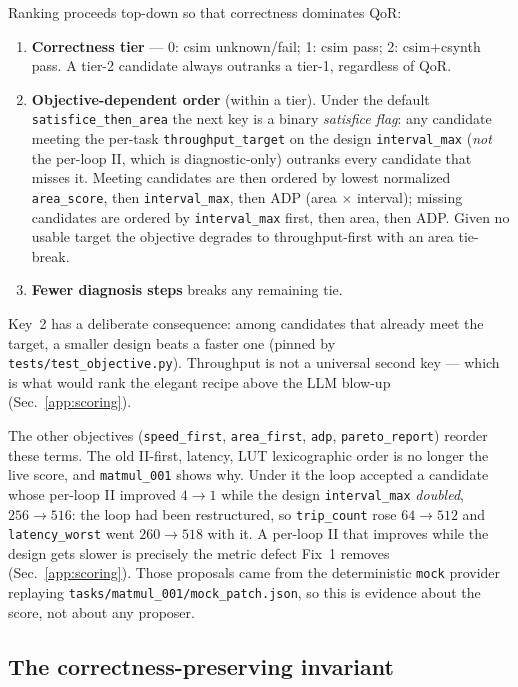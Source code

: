Ranking proceeds top-down so that correctness dominates QoR:
\begin{enumerate}
  \item \textbf{Correctness tier} --- 0: csim unknown/fail; 1: csim
    pass; 2: csim+csynth pass. A tier-2 candidate always outranks a
    tier-1, regardless of QoR.
  \item \textbf{Objective-dependent order} (within a tier). Under the
    default \texttt{satisfice\_then\_area} the next key is a binary
    \emph{satisfice flag}: any candidate meeting the per-task
    \texttt{throughput\_target} on the design \texttt{interval\_max}
    (\emph{not} the per-loop II, which is diagnostic-only) outranks
    every candidate that misses it. Meeting candidates are then ordered
    by lowest normalized \texttt{area\_score}, then
    \texttt{interval\_max}, then ADP (area $\times$ interval); missing
    candidates are ordered by \texttt{interval\_max} first, then area,
    then ADP. Given no usable target the objective degrades to
    throughput-first with an area tie-break.
  \item \textbf{Fewer diagnosis steps} breaks any remaining tie.
\end{enumerate}

Key~2 has a deliberate consequence: among candidates that already meet the
target, a smaller design beats a faster one (pinned by
\texttt{tests/test\_objective.py}). Throughput is not a universal second key
--- which is what would rank the elegant recipe above the LLM blow-up
(Sec.~\ref{app:scoring}).

The other objectives (\texttt{speed\_first}, \texttt{area\_first},
\texttt{adp}, \texttt{pareto\_report}) reorder these terms. The old
II-first, latency, LUT lexicographic order is no longer the live score,
and \texttt{matmul\_001} shows why. Under it the loop accepted a candidate
whose per-loop II improved $4 \rightarrow 1$ while the design
\texttt{interval\_max} \emph{doubled}, $256 \rightarrow 516$: the loop had
been restructured, so \texttt{trip\_count} rose $64 \rightarrow 512$ and
\texttt{latency\_worst} went $260 \rightarrow 518$ with it. A per-loop II
that improves while the design gets slower is precisely the metric defect
Fix~1 removes (Sec.~\ref{app:scoring}). Those proposals came from the
deterministic \texttt{mock} provider replaying
\texttt{tasks/matmul\_001/mock\_patch.json}, so this is evidence about the
score, not about any proposer.

\subsection{The correctness-preserving invariant}\label{app:arch:invariant}


